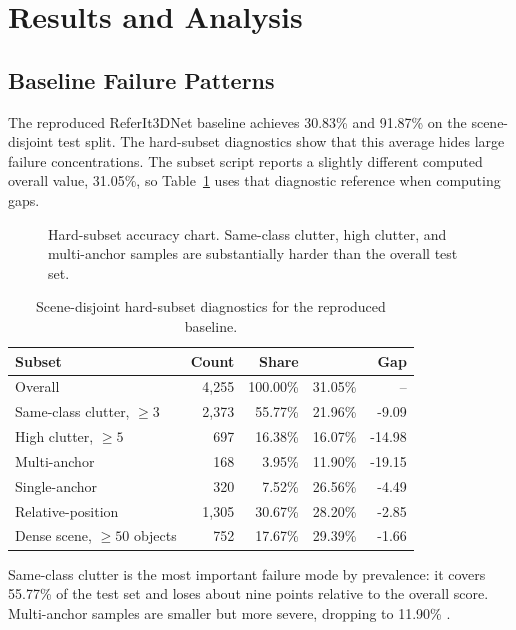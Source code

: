 \section{Results and Analysis}

\subsection{Baseline Failure Patterns}

The reproduced ReferIt3DNet baseline achieves 30.83\% \acc{} and 91.87\% \acctopfive{} on the scene-disjoint test split. The hard-subset diagnostics show that this average hides large failure concentrations. The subset script reports a slightly different computed overall value, 31.05\%, so Table~\ref{tab:hard-subsets} uses that diagnostic reference when computing gaps.

\begin{figure}[!htbp]
  \centering
  
  \caption{Hard-subset accuracy chart. Same-class clutter, high clutter, and multi-anchor samples are substantially harder than the overall test set.}
  \label{fig:hard-subsets}
\end{figure}

\begin{table}[!htbp]
\centering
\small
\caption{Scene-disjoint hard-subset diagnostics for the reproduced baseline.}
\label{tab:hard-subsets}
\begin{tabular}{lrrrr}
\toprule
Subset & Count & Share & \acc{} & Gap \\
\midrule
Overall & 4,255 & 100.00\% & 31.05\% & -- \\
Same-class clutter, $\geq 3$ & 2,373 & 55.77\% & 21.96\% & -9.09 \\
High clutter, $\geq 5$ & 697 & 16.38\% & 16.07\% & -14.98 \\
Multi-anchor & 168 & 3.95\% & 11.90\% & -19.15 \\
Single-anchor & 320 & 7.52\% & 26.56\% & -4.49 \\
Relative-position & 1,305 & 30.67\% & 28.20\% & -2.85 \\
Dense scene, $\geq 50$ objects & 752 & 17.67\% & 29.39\% & -1.66 \\
\bottomrule
\end{tabular}
\end{table}

Same-class clutter is the most important failure mode by prevalence: it covers 55.77\% of the test set and loses about nine points relative to the overall score. Multi-anchor samples are smaller but more severe, dropping to 11.90\% \acc{}.

